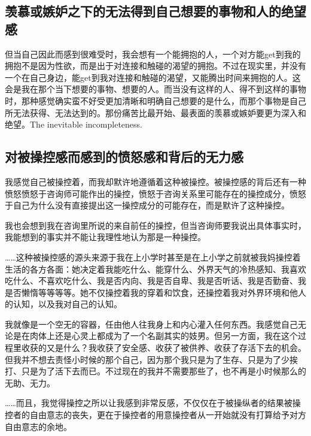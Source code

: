 

\subsection*{羡慕或嫉妒之下的无法得到自己想要的事物和人的绝望感}

但当自己因此而感到很难受时，我会想有一个能拥抱的人，一个对方能get到我的拥抱不是因为性欲，而是出于对连接和触碰的渴望的拥抱。不过在现实里，并没有一个在自己身边，能get到我对连接和触碰的渴望，又能腾出时间来拥抱的人。这会是我在那个当下想要的事物、想要的人。而当没有这样的人、得不到这样的事物时，那种感觉确实蛮不好受\pozhehao{}更加清晰和明确自己想要的是什么，而那个事物是自己所无法获得、无法达到的。那份痛苦比最开始、最表面的羡慕或嫉妒要更为深入和绝望。The inevitable incompleteness.



\subsection*{对被操控感而感到的愤怒感和背后的无力感}

我感觉自己被操控着，而我却默许地遵循着这种被操控。被操控感的背后还有一种愤怒\pozhehao{}愤怒于咨询师可能作出的操控，愤怒于咨询关系里可能存在的操控成分，愤怒于自己为什么没有直接提出这一操控成分的可能存在，而是默许了这种操控。

我也会想到我在咨询里所说的来自前任的操控，但当咨询师要我说出具体事实时，我能想到的事实并不能让我理性地认为那是一种操控。

……这种被操控感的源头来源于我在上小学时甚至是在上小学之前就被我妈操控着生活的各方各面：她决定着我能吃什么、能穿什么、外界天气的冷热感知、我喜欢吃什么、不喜欢吃什么、我是否内向、我是否自卑、我是否听话、我是否勤奋、我是否懒惰等等等等。她不仅操控着我的穿着和饮食，还操控着我对外界环境和他人的认知，以及我对自己的认知。

我就像是一个空无的容器，任由他人往我身上和内心灌入任何东西。我感觉自己无论是在肉体上还是心灵上都成为了一个名副其实的妓男。但另一方面，我在这个过程里收获的又是什么？我收获了安全感、收获了被供养、收获了存活下去的机会。但我并不想去责怪小时候的那个自己，因为那个我只是为了生存、只是为了少挨打、只是为了活下去而已。不过现在的我并不需要那些了，也不再是小时候那么的无助、无力。

……而且，我觉得操控之所以让我感到非常反感，不仅仅在于被操纵者的结果\pozhehao{}被操控者的自由意志的丧失，更在于操控者的用意\pozhehao{}操控者从一开始就没有打算给予对方自由意志的余地。

